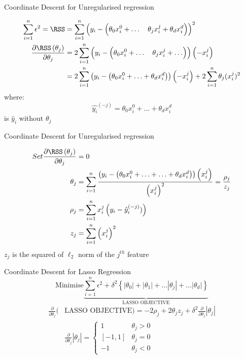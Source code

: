 \documentclass{beamer}
\begin{document}
\begin{frame}{Coordinate Descent for Unregularised regression}

\begin{align*}
\sum_{i=1}^{n}  \epsilon^{2}=\RSS &=\sum_{i=1}^{n}\left(y_{i}-\left(\theta_{0}x_{i}^{0}+\ldots \quad \theta_{j} x_{i}^{j}+\theta_{d} x_{i}^{d}\right)\right)^{2}\\
\frac{\partial \RSS\left(\theta_{j}\right)}{\partial \theta_{j}}&= 2 \sum_{i=1}^{n}\left(y_{i}-\left(\theta_{0}x_{i}^{0}+\ldots \quad \theta_{j} x_{i}^{j}+\ldots \right)\right)\left(-x_{i}^{j}\right)\\
&=2\sum_{i=1}^{n}\left(y_{i}-\left(\theta_{0} x_{i}^{0}+\ldots + \theta_{d} x_{i}^{d}\right)\right)\left(-x_{i}^{j}\right)+2 \sum_{i=1}^{n} \theta_{j}(x_{i}^j)^2\\
\end{align*}
\pause where: $$\hat{y_{i}}^{(-j)} = \theta_{0} x_{i}^{0}+\ldots + \theta_{d} x_{i}^{d}$$ is $\hat{y}_{i}$ without $\theta_{j}$
\end{frame}

\begin{frame}{Coordinate Descent for Unregularised regression}

\begin{align*}
Set \frac{\partial \RSS\left(\theta_{j}\right)}{\partial \theta_{j}}&= 0\\
\theta_{j}&=\sum_{i=1}^{n} \frac{\left(y_{i}-\left(\theta_{0} x_{i}^{0}+\ldots + \ldots + \theta_{d}
x_{i}^{d}\right)\right)\left(x_{i}^{j}\right)}{\left(x_{i}^{j}\right)^{2}}= \frac{\rho_{j}}{z_{j}}\\
\rho_{j} &=\sum_{i=1}^{n} x_{i}^{j}\left(y_{i}-{\hat{y}_{i}^{(-j)}})\right)\\
z_{j}&=\sum_{i=1}^{n}\left(x_{i}^{j}\right)^{2}
\end{align*}
$z_{j}$ is the squared of $\ell_2$ norm of the $j^{th}$ feature
\end{frame}

%




\begin{frame}{Coordinate Descent for Lasso Regression}
\[
\text{Minimise} \underbrace{\sum_{i=1}^{n} \epsilon^{2} + \delta^{2}\left\{\left|\theta_{0}\right|+\left|\theta_{1}\right|+\ldots\left|\theta_{j}\right|+\ldots |\theta_{d}|\right\}}_{\text{LASSO OBJECTIVE}}
\]
\begin{align*}
\frac{\partial}{\partial \theta_{j}}(& \text {LASSO OBJECTIVE})=-2 \rho_{j}+2 \theta_{j} z_{j}+\delta^{2}{\frac{\partial}{\partial \theta_{j}}}\left|\theta_{j}\right|\\[18pt]
&\frac{\partial}{\partial \theta_{j}}\left|\theta_{j}\right|=\left\{\begin{array}{cc}
{1} & {\theta_{j}>0} \\
{[-1,1]} & {\theta_{j}=0} \\
{-1} & {\theta_{j}<0}
\end{array}\right.
\end{align*}
\end{frame}
\end{document}
